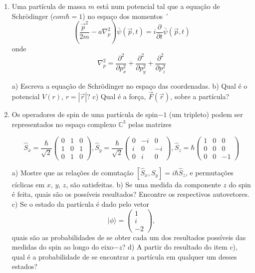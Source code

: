 \begin{enumerate}[start=1,label={\bfseries Q\arabic*.}]
\item Uma partícula de massa $m$ está num potencial tal que a equação de Schrödinger ($com \hbar = 1$) no espaço dos momentos ´
$$
\left(\frac{\vec{p}^{2}}{2 m}-a \nabla_{p}^{2}\right) \bar{\psi}(\vec{p}, t)=i \frac{\partial}{\partial t} \bar{\psi}(\vec{p}, t)
$$
onde
$$
\nabla_{p}^{2}=\frac{\partial^{2}}{\partial p_{x}^{2}}+\frac{\partial^{2}}{\partial p_{y}^{2}}+\frac{\partial^{2}}{\partial p_{z}^{2}}
$$

a) Escreva a equação de Schrödinger no espaço das coordenadas.
b) Qual é o potencial $V (r)$, $r = |\vec{r}|$?
c) Qual é a força, $\vec{F}(\vec{r})$, sobre a partícula?




\item Os operadores de spin de uma partícula de spin$-1$ (um tripleto) podem ser representados no espaço complexo $\mathbb{C}^{3}$ pelas matrizes

$$
\hat{S}_{x}=\frac{\hbar}{\sqrt{2}}\left(\begin{array}{ccc}
0 & 1 & 0 \\
1 & 0 & 1 \\
0 & 1 & 0
\end{array}\right), \hat{S}_{y}=\frac{\hbar}{\sqrt{2}}\left(\begin{array}{ccc}
0 & -i & 0 \\
i & 0 & -i \\
0 & i & 0
\end{array}\right), \hat{S}_{z}=\hbar\left(\begin{array}{ccc}
1 & 0 & 0 \\
0 & 0 & 0 \\
0 & 0 & -1
\end{array}\right)
$$


a) Mostre que as relações de comutação $\left[\hat{S}_{x}, \hat{S}_{y}\right]=i \hbar \hat{S}_{z}$, e permutações cíclicas em $x$, $y$, $z$, são satisfeitas.
b) Se uma medida da componente $z$ do spin é feita, quais são os possíveis resultados? Encontre os respectivos autovetores.
c) Se o estado da partícula é dado pelo vetor
$$
|\phi\rangle=\left(\begin{array}{c}
1 \\
i \\
-2
\end{array}\right),
$$
quais são as probabilidades de se obter cada um dos resultados possíveis das medidas do spin ao longo do eixo$-z$?
d) A partir do resultado do item c), qual é a probabilidade de se encontrar a partícula em qualquer um desses estados?







\end{enumerate}
